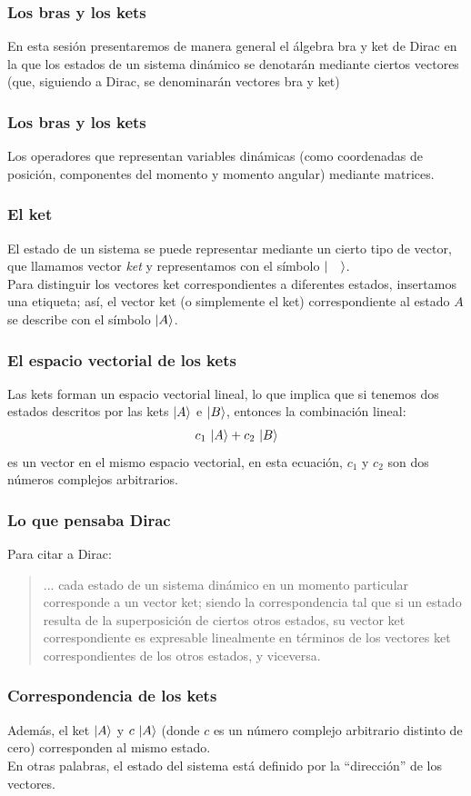 \documentclass[12pt]{beamer}
\begin{document}
\begin{frame}
\frametitle{Los bras y los kets}
En esta sesión presentaremos de manera general el álgebra bra y ket de Dirac en la que los estados de un sistema dinámico se denotarán mediante ciertos vectores (que, siguiendo a Dirac, se denominarán vectores bra y ket)
\end{frame}
\begin{frame}
\frametitle{Los bras y los kets}
Los operadores que representan variables dinámicas (como coordenadas de posición, componentes del momento y momento angular) mediante matrices.
\end{frame}
\begin{frame}
\frametitle{El ket}
El estado de un sistema se puede representar mediante un cierto tipo de vector, \pause que llamamos vector \emph{ket} y representamos con el símbolo $\ket{ \quad }$.
\\
\bigskip
\pause
Para distinguir los vectores ket correspondientes a diferentes estados, insertamos una etiqueta; así, el vector ket (o simplemente el ket) correspondiente al estado $A$ se describe con el símbolo $\ket{A}$.
\end{frame}
\begin{frame}
\frametitle{El espacio vectorial de los kets}
Las kets forman un espacio vectorial lineal, lo que implica que si tenemos dos estados descritos por las kets $\ket{A}$ e $\ket{B}$, entonces la combinación lineal:
\pause
\begin{align*}
c_{1} \, \ket{A} + c_{2} \, \ket{B}
\end{align*}
\pause
es un vector en el mismo espacio vectorial, en esta ecuación, $c_{1}$ y $c_{2}$ son dos números complejos arbitrarios.
\end{frame}
\begin{frame}
\frametitle{Lo que pensaba Dirac}
Para citar a Dirac:
\begin{quote}
... cada estado de un sistema dinámico en un momento particular corresponde a un vector ket; siendo la correspondencia tal que si un estado resulta de la superposición de ciertos otros estados, su vector ket correspondiente es expresable linealmente en términos de los vectores ket correspondientes de los otros estados, y viceversa.
\end{quote}
\end{frame}
\begin{frame}
\frametitle{Correspondencia de los kets}
Además, el ket $\ket{A}$ y $c \, \ket{A}$ (donde $c$ es un número complejo arbitrario distinto de cero) corresponden al mismo estado.
\\
\bigskip
\pause
En otras palabras, el estado del sistema está definido por la \enquote{dirección} de los vectores.
\end{frame}
\end{document}
